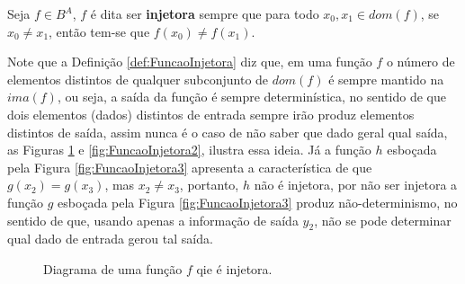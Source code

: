 \begin{definicao}\label{def:FuncaoInjetora}
	Seja $f \in B^A$, $f$ é dita ser \textbf{injetora} sempre que para todo $x_0, x_1 \in dom(f)$, se $x_0 \neq x_1$, então tem-se que $f(x_0) \neq f(x_1)$.
\end{definicao}

Note que a Definição \ref{def:FuncaoInjetora} diz que, em uma função $f$ o número de elementos distintos de qualquer subconjunto de $dom(f)$ é sempre mantido na $ima(f)$, ou seja, a saída da função é sempre determinística, no sentido de que dois elementos (dados) distintos de entrada sempre irão produz elementos distintos de saída, assim nunca é o caso de não saber que dado geral qual saída, as Figuras \ref{fig:FuncaoInjetora1} e \ref{fig:FuncaoInjetora2}, ilustra essa ideia. Já a função $h$ esboçada pela Figura \ref{fig:FuncaoInjetora3} apresenta a característica de que $g(x_2) = g(x_3)$, mas $x_2 \neq x_3$, portanto, $h$ não é injetora, por não ser injetora a função $g$ esboçada pela Figura \ref{fig:FuncaoInjetora3} produz não-determinismo, no sentido de que, usando apenas a informação de saída $y_2$, não se pode determinar qual dado de entrada gerou tal saída.

\begin{figure}[h]
	\centering
	\caption{Diagrama de uma função $f$ qie é injetora.}
	\label{fig:FuncaoInjetora1}	
\end{figure}

